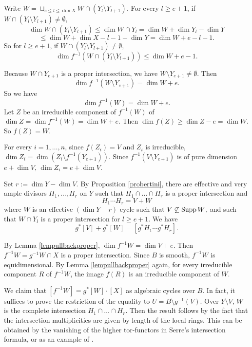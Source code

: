 \documentclass[12pt]{amsart}
\begin{document}
\proof
Write $W=\sqcup_{e\leq l\leq \dim X} W\cap(Y_l\setminus Y_{l+1}).$
For every $l\geq e+1$, if $W\cap(Y_l\setminus Y_{l+1})\neq \emptyset,$
$$\dim W\cap(Y_l\setminus Y_{l+1})\leq \dim W\cap Y_l=\dim W+\dim Y_l-\dim Y$$
$$\leq \dim W+\dim X-l-1-\dim Y=\dim W+e-l-1.$$
So for $l\geq e+1$, if $W\cap(Y_l\setminus Y_{l+1})\neq \emptyset,$ 
$$\dim f^{-1}(W\cap (Y_l\setminus Y_{l+1}))\leq \dim W+e-1.$$


\medskip

Because $W\cap Y_{e+1}$ is a proper intersection, we have $W\setminus Y_{e+1}\neq \emptyset.$
Then $$\dim f^{-1}(W\setminus Y_{e+1})=\dim W+e.$$
So we have $$\dim f^{-1}(W)=\dim W+e.$$
Let $Z$ be an irreducible component of $f^{-1}(W)$ of $\dim Z=\dim f^{-1}(W)=\dim W+e$.
Then $\dim f(Z)\geq \dim Z-e= \dim W.$ So $f(Z)=W.$
\endproof



For every $i=1,\dots,n$, since $f(Z_i)=V$ and $Z_i$ is irreducible, 
$\dim Z_i=\dim (Z_i\setminus f^{-1}(Y_{e+1})).$
Since $f^{-1}(V\setminus Y_{e+1})$ is of pure dimension $e+\dim V$,  $\dim Z_i=e+\dim V.$ 

Set $r:=\dim Y-\dim V.$ 
By Proposition \ref{probertini},  there are effective and very ample divisors $H_1,\dots, H_r$ on $Y$ such that 
$H_1\cap \dots \cap H_r$ is a proper intersection and 
$$H_1\cdots H_r=V+W$$
where $W$ is an effective $(\dim Y-r)$-cycle such that 
$V\not\subseteq {\rm Supp} \,W$, and such that $W\cap Y_l$ is a proper intersection
for $l\geq e+1$.
We have $$g^*[V]+g^*[W]=[g^*H_1\cdots g^*H_r].$$

By Lemma \ref{lempullbackproper}, $\dim f^{-1}W=\dim V+e.$  
Then $f^{-1}W=g^{-1}W \cap X$ is a proper intersection. Since $B$ is smooth, $f^{-1}W$ is equidimensional. 
By Lemma \ref{lempullbackproper} again, for every irreducible component $R$ of $f^{-1}W$, the image $f(R)$ is an irreducible component of $W.$

We claim that $[f^{-1}W]=g^*[W]\cdot [X]$ as algebraic cycles over $B$. 
In fact, it suffices to prove the restriction of the equality to $U=B\setminus g^{-1}(V)$. Over $Y\setminus V$, $W$ is the complete intersection $H_1\cap \dots \cap H_r$. 
Then the result follows by the fact that the intersection multiplicities are given by length of the local rings. 
This can be obtained by the vanishing of the higher tor-functors in Serre's intersection formula, or as an example of \cite[Proposition 7.1 (b)]{Fulton1984}. 
\end{document}
